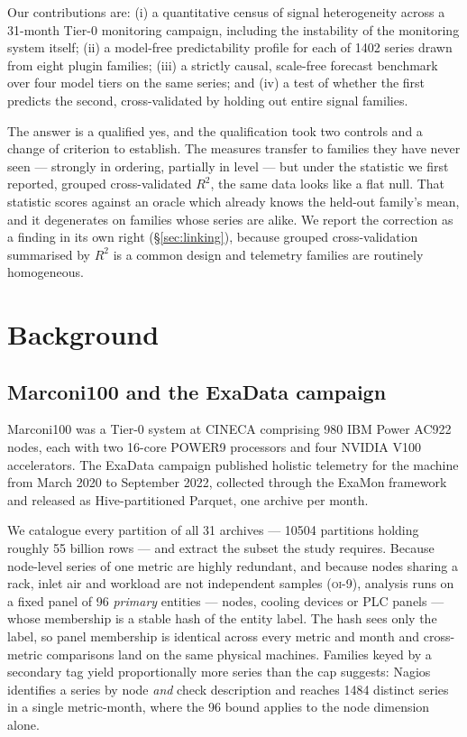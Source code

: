 \documentclass[11pt,a4paper]{article}
\newcommand{\num}[1]{#1}
\newcommand{\oi}[1]{\textsc{oi-#1}}
\begin{document}
Our contributions are: (i) a quantitative census of signal heterogeneity across
a 31-month Tier-0 monitoring campaign, including the instability of the
monitoring system itself; (ii) a model-free predictability profile for each of
\num{1402} series drawn from eight plugin families; (iii) a strictly causal,
scale-free forecast benchmark over four model tiers on the same series; and
(iv) a test of whether the first predicts the second, cross-validated by holding
out entire signal families.

The answer is a qualified yes, and the qualification took two controls and a
change of criterion to establish. The measures transfer to families they have
never seen --- strongly in ordering, partially in level --- but under the
statistic we first reported, grouped cross-validated \(R^2\), the same data
looks like a flat null. That statistic scores against an oracle which already
knows the held-out family's mean, and it degenerates on families whose series
are alike. We report the correction as a finding in its own right
(\S\ref{sec:linking}), because grouped cross-validation summarised by \(R^2\) is
a common design and telemetry families are routinely homogeneous.

\section{Background}
\label{sec:background}

\subsection{Marconi100 and the ExaData campaign}

Marconi100 was a Tier-0 system at CINECA comprising 980 IBM Power AC922 nodes,
each with two 16-core POWER9 processors and four NVIDIA V100 accelerators. The
ExaData campaign published holistic telemetry for the machine from March 2020 to
September 2022, collected through the ExaMon framework and released as
Hive-partitioned Parquet, one archive per month.

We catalogue every partition of all 31 archives --- \num{10504} partitions
holding roughly \num{55} billion rows --- and extract the subset the study
requires. Because node-level series of one metric are highly redundant, and
because nodes sharing a rack, inlet air and workload are not independent
samples (\oi{9}), analysis runs on a fixed panel of \num{96} \emph{primary}
entities --- nodes, cooling devices or PLC panels --- whose membership is a
stable hash of the entity label. The hash sees only the label, so panel
membership is identical across every metric and month and cross-metric
comparisons land on the same physical machines. Families keyed by a secondary
tag yield proportionally more series than the cap suggests: Nagios identifies a
series by node \emph{and} check description and reaches \num{1484} distinct
series in a single metric-month, where the \num{96} bound applies to the node
dimension alone.
\end{document}
